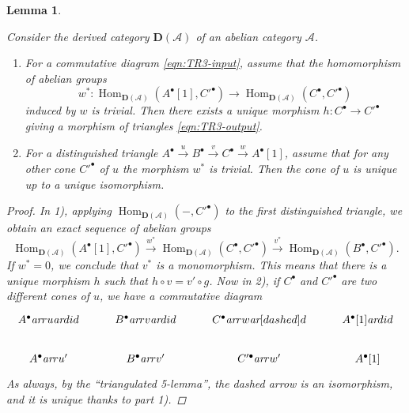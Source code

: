 \documentclass[leqno,12pt]{article}
\theoremstyle{plain}
\newtheorem{lemma}[theorem]{\indent\sc Lemma}
\theoremstyle{definition}
\DeclareMathOperator{\Hom}{Hom}
\newcommand{\ar}{\text{\it ar}}
\begin{document}
\begin{lemma}
  \label{lemma:TR3-TR1-with-uniqueness-general-statement}

  Consider the derived category $\mathbf{D} (\mathcal{A})$ of an abelian
  category $\mathcal{A}$.

  \begin{enumerate}
  \item[$1)$] For a commutative diagram \eqref{eqn:TR3-input}, assume that the
    homomorphism of abelian groups
    \[ w^*\colon \Hom_{\mathbf{D} (\mathcal{A})} (A^\bullet [1], C'^\bullet) \to
    \Hom_{\mathbf{D} (\mathcal{A})} (C^\bullet, C'^\bullet) \]
    induced by $w$ is trivial. Then there exists a unique morphism
    $h\colon C^\bullet \to C'^\bullet$ giving a morphism of triangles
    \eqref{eqn:TR3-output}.

  \item[$2)$] For a distinguished triangle
    $A^\bullet \xrightarrow{u} B^\bullet \xrightarrow{v} C^\bullet \xrightarrow{w} A^\bullet[1]$,
    assume that for any other cone $C'^\bullet$ of $u$ the morphism $w^*$ is
    trivial. Then the cone of $u$ is unique up to a unique isomorphism.
  \end{enumerate}

  \begin{proof}
    In 1), applying $\Hom_{\mathbf{D} (\mathcal{A})} (-, C'^\bullet)$ to the
    first distinguished triangle, we obtain an exact sequence of abelian groups
    \[ \Hom_{\mathbf{D} (\mathcal{A})} (A^\bullet [1], C'^\bullet) \xrightarrow{w^*}
    \Hom_{\mathbf{D} (\mathcal{A})} (C^\bullet, C'^\bullet) \xrightarrow{v^*}
    \Hom_{\mathbf{D} (\mathcal{A})} (B^\bullet, C'^\bullet). \]
    If $w^* = 0$, we conclude that $v^*$ is a monomorphism. This means that
    there is a unique morphism $h$ such that $h\circ v = v'\circ g$. Now in 2),
    if $C^\bullet$ and $C'^\bullet$ are two different cones of $u$, we have a
    commutative diagram
    \[ \begin{tikzcd}
      A^\bullet\ar{r}{u}\ar{d}{id} & B^\bullet\ar{r}{v}\ar{d}{id} & C^\bullet\ar{r}{w}\ar[dashed]{d} & A^\bullet [1]\ar{d}{id} \\
      A^\bullet\ar{r}{u'} & B^\bullet\ar{r}{v'} & C'^\bullet\ar{r}{w'} & A^\bullet [1]
    \end{tikzcd} \]
    As always, by the ``triangulated 5-lemma'', the dashed arrow is an
    isomorphism, and it is unique thanks to part 1).
  \end{proof}
\end{lemma}
\end{document}
